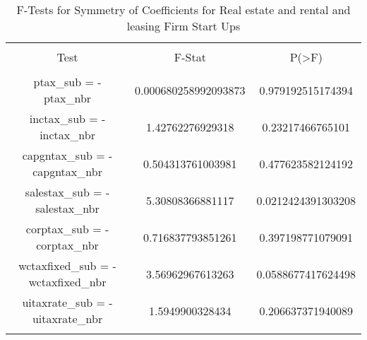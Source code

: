 
\begin{table}[!htbp] \centering 
  \caption{F-Tests for Symmetry of Coefficients for Real estate and rental and leasing Firm Start Ups} 
  \label{} 
\begin{tabular}{@{\extracolsep{5pt}} ccc} 
\\[-1.8ex]\hline 
\hline \\[-1.8ex] 
Test & F-Stat & P(\textgreater F) \\ 
\hline \\[-1.8ex] 
ptax\_sub = -ptax\_nbr & 0.000680258992093873 & 0.979192515174394 \\ 
inctax\_sub = -inctax\_nbr & 1.42762276929318 & 0.23217466765101 \\ 
capgntax\_sub = -capgntax\_nbr & 0.504313761003981 & 0.477623582124192 \\ 
salestax\_sub = -salestax\_nbr & 5.30808366881117 & 0.0212424391303208 \\ 
corptax\_sub = -corptax\_nbr & 0.716837793851261 & 0.397198771079091 \\ 
wctaxfixed\_sub = -wctaxfixed\_nbr & 3.56962967613263 & 0.0588677417624498 \\ 
uitaxrate\_sub = -uitaxrate\_nbr & 1.5949900328434 & 0.206637371940089 \\ 
\hline \\[-1.8ex] 
\end{tabular} 
\end{table} 
